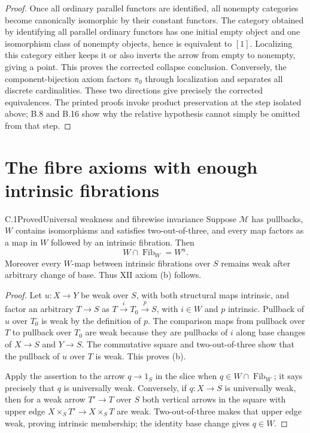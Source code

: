\begin{proof}
Once all ordinary parallel functors are identified, all nonempty
categories become canonically isomorphic by their constant functors.
The category obtained by identifying all parallel ordinary functors
has one initial empty object and one isomorphism class of nonempty
objects, hence is equivalent to $[1]$. Localizing this category
either keeps it or also inverts the arrow from empty to nonempty,
giving a point. This proves the corrected collapse conclusion.
Conversely, the component-bijection axiom factors $\pi_0$ through
localization and separates all discrete cardinalities. These two
directions give precisely the corrected equivalences. The printed
proofs invoke product preservation at the step isolated above;
B.8 and B.16 show why the relative hypothesis cannot simply be
omitted from that step.
\end{proof}

\section{The fibre axioms with enough intrinsic fibrations}

\begin{claim}{C.1}{Proved}{Universal weakness and fibrewise invariance}
Suppose $\mathcal M$ has pullbacks, $W$ contains isomorphisms and
satisfies two-out-of-three, and every map factors as a map in $W$
followed by an intrinsic fibration. Then
\[
 W\cap\operatorname{Fib}_W=W^u.
\]
Moreover every $W$-map between intrinsic fibrations over $S$ remains
weak after arbitrary change of base. Thus XII axiom (b) follows.
\end{claim}
\begin{proof}
Let $u:X\to Y$ be weak over $S$, with both structural maps intrinsic,
and factor an arbitrary $T\to S$ as $T\xrightarrow i T_0
\xrightarrow p S$, with $i\in W$ and $p$ intrinsic. Pullback of $u$
over $T_0$ is weak by the definition of $p$. The comparison maps from
pullback over $T$ to pullback over $T_0$ are weak because they are
pullbacks of $i$ along base changes of $X\to S$ and $Y\to S$.
The commutative square and two-out-of-three show that the pullback of
$u$ over $T$ is weak. This proves (b).

Apply the assertion to the arrow $q\to1_S$ in the slice when
$q\in W\cap\operatorname{Fib}_W$; it says precisely that $q$ is
universally weak. Conversely, if $q:X\to S$ is universally weak,
then for a weak arrow $T'\to T$ over $S$ both vertical arrows in the
square with upper edge $X\times_ST'\to X\times_ST$ are weak.
Two-out-of-three makes that upper edge weak, proving intrinsic
membership; the identity base change gives $q\in W$.
\end{proof}

